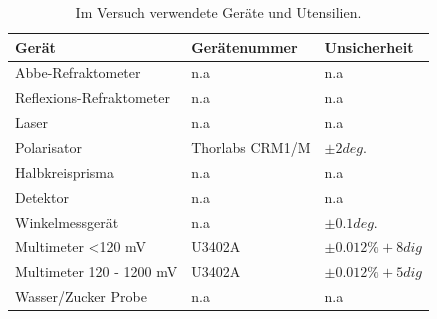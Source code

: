 \documentclass[12pt,a4paper,twoside]{article}
\begin{document}
    \begin{table}[H]
        \centering
        \caption{Im Versuch verwendete Geräte und Utensilien.}
        \label{tab:geraete}
        \begin{tabular}{| l | l | l |}
            \hline
            Gerät   & Gerätenummer  & Unsicherheit \\
            \hline
            Abbe-Refraktometer & {n.a} & {n.a} \\
            Reflexions-Refraktometer & {n.a} & {n.a} \\
            Laser & {n.a} & {n.a} \\
            Polarisator & Thorlabs CRM1/M & $\pm 2 deg. $ \\
            Halbkreisprisma & {n.a} & {n.a} \\
            Detektor & {n.a} & {n.a} \\
            Winkelmessgerät & {n.a} & $\pm 0.1 deg. $ \\
            Multimeter <120 mV & U3402A & $\pm 0.012 \% + 8 dig$ \cite{multimeter} \\
            Multimeter 120 - 1200 mV & U3402A & $\pm 0.012 \% + 5 dig$ \cite{multimeter} \\
            Wasser/Zucker Probe & {n.a} & {n.a}\\
            \hline
        \end{tabular}
    \end{table}
\end{document}
